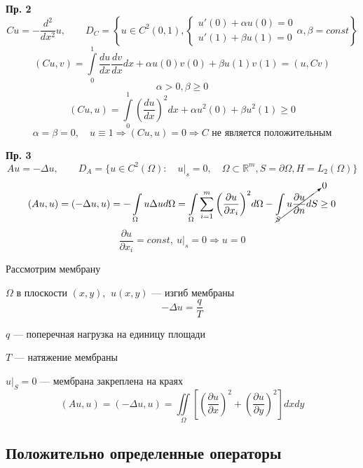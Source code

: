 \textbf{Пр. 2}
\[ Cu = - \frac{ d^2 }{dx^2 }u, \qquad D_C = \left\{ u \in C^2(0,1),
\begin{cases}
	u'(0)+\alpha u(0)=0 \\
	u'(1)+\beta u(1)=0
\end{cases}
\alpha, \beta = const
\right\}
\]
\[(Cu, v) = \int\limits_{0}^{1} \frac{du}{dx} \frac{dv}{dx} dx + \alpha u(0)v(0) + \beta u(1)v(1) = (u, Cv)\]
\[\alpha > 0, \beta \geq 0\]
\[(Cu, u) = \int\limits_{0}^{1} {\left(\frac{du}{dx}\right)}^2 dx + \alpha u^2(0) + \beta u^2(1) \geq 0\]
\[\alpha = \beta = 0, \quad u \equiv 1 \Rightarrow (Cu, u) = 0 \Rightarrow C \text{ не является положительным}\]

\textbf{Пр. 3}
\[ Au = - \Delta u , \qquad D_A = \{ u \in C^2(\Omega): \quad u|_s = 0, \quad \Omega \subset \mathbb{R}^m, S = \partial \Omega, H = L_2(\Omega) \} \]
\[ (Au, u) = (-\Delta u, u ) = - \int\limits_{\Omega }^{} u \Delta u d \Omega = \int\limits_{\Omega }^{} \sum_{i = 1}^{m } {\left(\frac{\partial u }{\partial x_i }\right)}^2 d\Omega - \cancelto{0}{\int\limits_{S }^{} u \frac{\partial u }{\partial n } dS}  \geq 0 \]
\[ \frac{\partial u }{\partial x_i } = const, \ u|_s = 0 \Rightarrow u = 0 \]

\newpage

Рассмотрим мембрану

$\Omega$ в плоскости $(x,y)$, $\ u(x,y)$ --- изгиб мембраны
\[ - \Delta u = \frac{q}{T} \]

$q$ --- поперечная нагрузка на единицу площади

$T$ --- натяжение мембраны

$ {u|}_S = 0 $ --- мембрана закреплена на краях
\[ (A u , u) = (- \Delta u , u) = \iint\limits_{\Omega} \left[ \left(\frac{\partial u }{\partial x }\right)^2 + \left(\frac{ \partial u }{\partial y }\right)^2 \right] dx dy  \]

\subsection{Положительно определенные операторы}

